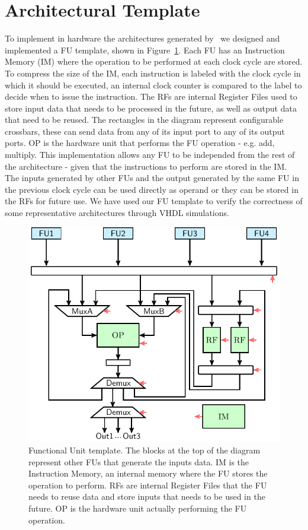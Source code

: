 \section{Architectural Template}
\label{sec:arch_template}
To implement in hardware the architectures generated by \frameworkname~we designed and implemented a FU template, shown in Figure~\ref{fig:FU_templ}. Each FU has an Instruction Memory (IM) where the operation to be performed at each clock cycle are stored. To compress the size of the IM, each instruction is labeled with the clock cycle in which it should be executed, an internal clock counter is compared to the label to decide when to issue the instruction. The RFs are internal Register Files used to store input data that needs to be processed in the future, as well as output data that need to be reused. The rectangles in the diagram represent configurable crossbars, these can send data from any of its input port to any of its output ports. OP is the hardware unit that performs the FU operation - e.g. add, multiply. This implementation allows any FU to be independed from the rest of the architecture - given that the instructions to perform are stored in the IM. The inputs generated by other FUs and the output generated by the same FU in the previous clock cycle can be used directly as operand or they can be stored in the RFs for future use. 
We have used our FU template to verify the correctness of some representative architectures through VHDL simulations.

\begin{figure}[tb] 
\centering
\includegraphics[width=.9\columnwidth,left]{images/functional_unit.pdf}
    \caption{\small Functional Unit template. The blocks at the top of the diagram represent other FUs that generate the inputs data. IM is the Instruction Memory, an internal memory where the FU stores the operation to perform. RFs are internal Register Files that the FU needs to reuse data and store inputs that needs to be used in the future. OP is the hardware unit actually performing the FU operation.}
\label{fig:FU_templ}
\end{figure}
